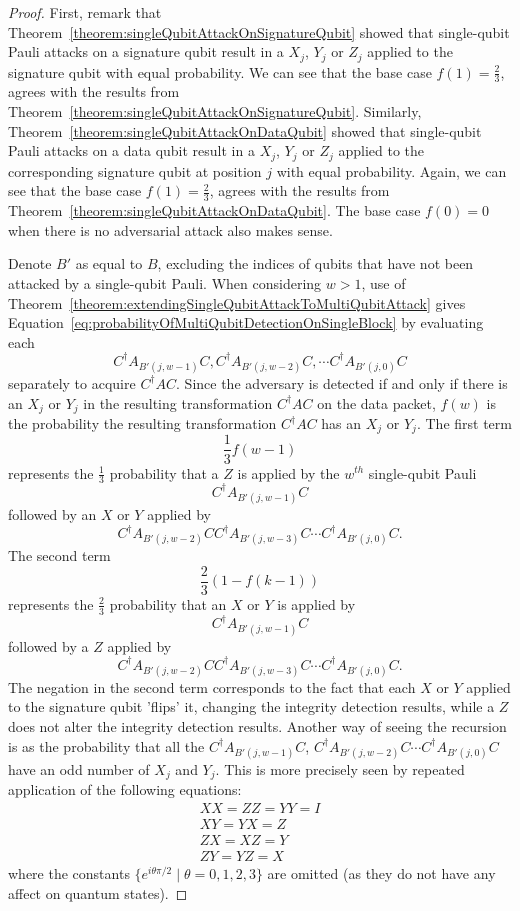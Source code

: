 \begin{proof}
First, remark that
Theorem~\ref{theorem:singleQubitAttackOnSignatureQubit} showed that single-qubit Pauli attacks on a signature qubit result in a $X_j$, $Y_j$ or $Z_j$ applied to the signature qubit with equal probability. We can see that the base case $f(1) = \frac{2}{3}$, agrees with the results from Theorem~\ref{theorem:singleQubitAttackOnSignatureQubit}. Similarly, Theorem~\ref{theorem:singleQubitAttackOnDataQubit} showed that single-qubit Pauli attacks on a data qubit result in a $X_j$, $Y_j$ or $Z_j$ applied to the corresponding signature qubit at position $j$ with equal probability. Again, we can see that the base case $f(1) = \frac{2}{3}$, agrees with the results from Theorem~\ref{theorem:singleQubitAttackOnDataQubit}. The base case $f(0) = 0$ when there is no adversarial attack also makes sense.

Denote $B'$ as equal to $B$, excluding the indices of qubits that have not been attacked by a single-qubit Pauli. When considering $w > 1$, use of Theorem~\ref{theorem:extendingSingleQubitAttackToMultiQubitAttack} gives Equation~\eqref{eq:probabilityOfMultiQubitDetectionOnSingleBlock} by evaluating each $$C^{\dagger}A_{B'(j,w-1)}C, C^{\dagger}A_{B'(j,w-2)}C, \cdots C^{\dagger}A_{B'(j,0)}C$$ separately to acquire $C^{\dagger}AC$. Since the adversary is detected if and only if there is an $X_j$ or $Y_j$ in the resulting transformation $C^{\dagger}AC$ on the data packet, $f(w)$ is the probability the resulting transformation $C^{\dagger}AC$ has an $X_j$ or $Y_j$. The first term $$\frac{1}{3}f(w - 1)$$
represents the $\frac{1}{3}$ probability that a $Z$ is applied by the $w^{th}$ single-qubit Pauli
$$C^{\dagger}A_{B'(j,w-1)}C$$
followed by an $X$ or $Y$ applied by $$C^{\dagger}A_{B'(j,w-2)}C C^{\dagger}A_{B'(j,w-3)}C \cdots C^{\dagger}A_{B'(j,0)}C.$$ The second term
$$\frac{2}{3}(1 - f(k - 1))$$ 
represents the $\frac{2}{3}$ probability that an $X$ or $Y$ is applied by
$$C^{\dagger}A_{B'(j,w-1)}C$$
followed by a $Z$ applied by $$C^{\dagger}A_{B'(j,w-2)}C C^{\dagger}A_{B'(j,w-3)}C \cdots C^{\dagger}A_{B'(j,0)}C.$$ The negation in the second term corresponds to the fact that each $X$ or $Y$ applied to the signature qubit 'flips' it, changing the integrity detection results, while a $Z$ does not alter the integrity detection results. Another way of seeing the recursion is as the probability that all the $C^{\dagger}A_{B'(j,w-1)}C$, $C^{\dagger}A_{B'(j,w-2)}C \cdots C^{\dagger}A_{B'(j,0)}C$ have an odd number of $X_j$ and $Y_j$. This is more precisely seen by repeated application of the following equations:
\begin{align}
XX = ZZ = YY = I \\
XY = YX = Z\\
ZX = XZ = Y\\
ZY = YZ = X
\end{align}
where the constants $\{ e^{i\theta\pi/2} \mid \theta = 0,1,2,3\}$ are omitted (as they do not have any affect on quantum states).


\end{proof}
